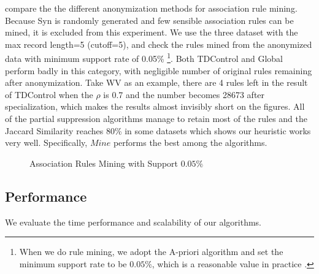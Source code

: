  compare the 
the different anonymization methods for association rule mining. 
Because Syn is randomly generated and few sensible 
association rules can be mined, 
it is excluded from this experiment.
We use the three dataset with the 
max record length=5 (cutoff=5), and check the rules mined from 
the anonymized data with minimum support rate of 0.05\% 
\footnote{When we do rule mining, we adopt the A-priori algorithm and 
set the minimum support rate to be $0.05\%$, which is a reasonable value 
in practice \cite{Zheng:2001:RWP:502512.502572}.}.
Both TDControl and Global perform badly in this category, 
with negligible number of original rules remaining after anonymization. 
Take WV as an example, there are 4 rules left in the result of TDControl 
when the $\rho$ is 0.7 and the number becomes 28673 after specialization, 
which makes the results almost invisibly short on the figures. 
All of the partial suppression algorithms manage to retain most of 
the rules and the Jaccard Similarity reaches 80\% in some datasets 
which shows our heuristic works very well. 
Specifically, $Mine$ performs the best among the algorithms.


\begin{figure}[th]
\centering
{}
\caption{Association Rules Mining with Support $0.05 \%$}
\label{fig:rulemining}
\end{figure}

\subsection{Performance}\label{sec:eval:performance}
We evaluate the time performance and scalability of
our algorithms.

